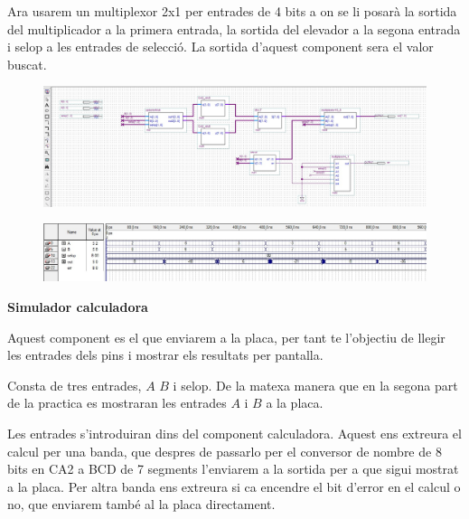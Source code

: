 \documentclass[12pt, a4papre]{article}
\begin{document}
\begin{center}
	Ara usarem un multiplexor 2x1 per entrades de 4 bits a on se li posarà la sortida del multiplicador a la primera entrada, la sortida del elevador a la segona entrada i selop a les entrades de selecció. La sortida d'aquest component sera el valor buscat.
	
	\begin{center}
	\begin{figure}[H]
		\begin{center}
		\includegraphics[width=150mm]{calculadora.jpeg}
		\end{center}
	\end{figure}
	\end{center}
		\begin{center}
	\begin{figure}[H]
		\begin{center}
		\includegraphics[width=150mm]{simuladoracalculadora.jpeg}
		\end{center}
	\end{figure}
	\end{center}
	
	\textbf{\large{Simulador calculadora}}
	
	Aquest component es el que enviarem a la placa, per tant te l'objectiu de llegir les entrades dels pins i mostrar els resultats per pantalla.
	
	Consta de tres entrades, $A$ $B$ i selop. De la matexa manera que en la segona part de la practica es mostraran les entrades $A$ i $B$ a la placa. 
	
	Les entrades s'introduiran dins del component calculadora. Aquest ens extreura el calcul per una banda, que despres de passarlo per el conversor de nombre de 8 bits en CA2 a BCD de 7 segments l'enviarem a la sortida per a que sigui mostrat a la placa. Per altra banda ens extreura si ca encendre el bit d'error en el calcul o no, que enviarem també al la placa directament.
	

\end{center}
\end{document}
